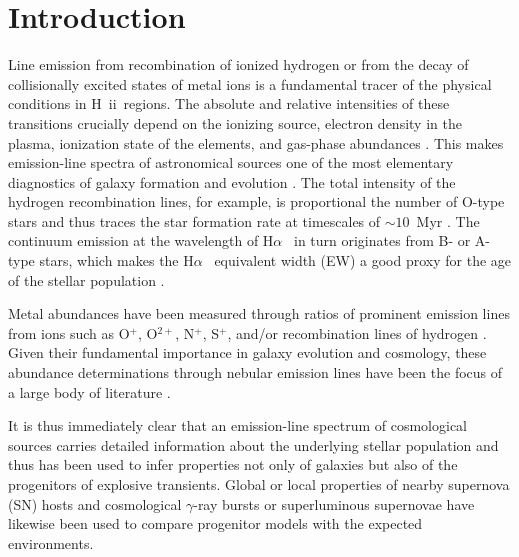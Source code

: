 \documentclass[traditabstract]{aa}
\newcommand{\ha}{H$\alpha$}
\newcommand{\hii}{\mbox{H~{\sc ii}}}
\begin{document}
\maketitle

\section{Introduction}
\label{sec:Intro}

Line emission from recombination of ionized hydrogen or from the decay of collisionally excited states of metal ions {is a fundamental tracer of the physical conditions in \hii\ regions}. The absolute and relative intensities of these transitions crucially depend on the ionizing source, electron density in the plasma, ionization state of the elements, and gas-phase abundances \citep{1989agna.book.....O}. This makes emission-line spectra of astronomical sources one of the most elementary diagnostics of galaxy formation and evolution \citep[e.g.,][]{2004ApJ...613..898T, 2006ApJ...644..813E, 2009ApJ...706.1364F}. The total intensity of the hydrogen recombination lines, for example, is proportional the number of O-type stars and thus traces the star formation rate at timescales of $\sim10$~Myr \citep[e.g.,][]{1998ARA&A..36..189K}. The continuum emission at the wavelength of \ha~ in turn originates from B- or A-type stars, which makes the \ha~ equivalent width (EW) a good proxy for the age of the stellar population \citep{1999ApJS..123....3L, 2013ApJ...779..170L}.

Metal abundances have been measured through ratios of prominent emission lines from ions such as O$^{+}$, O$^{2+}$, N$^{+}$, S$^{+}$, and/or recombination lines of hydrogen \citep{1979MNRAS.189...95P, 1979A&A....78..200A}. Given their fundamental importance in galaxy evolution and cosmology, these abundance determinations through nebular emission lines have been the focus of a large body of literature \citep[e.g.,][]{2004ApJ...617..240K, 2005ApJ...631..231P, 2006A&A...454L.127S, 2006A&A...448..955I, 2008ApJ...681.1183K}.

It is thus immediately clear that an emission-line spectrum of cosmological sources carries detailed information about the underlying stellar population and thus has been used to infer properties not only of galaxies but also of the progenitors of explosive transients. Global \citep[e.g.,][]{2008ApJ...673..999P, 2011MNRAS.412.1441L} or local \citep[e.g.,][]{2010MNRAS.407.2660A, 2011ApJ...731L...4M, 2011A&A...530A..95L} properties of nearby supernova (SN) hosts and cosmological $\gamma$-ray bursts \citep[GRBs; e.g.,][]{2007A&A...464..529W, 2012A&A...546A...8K, 2013ApJ...774..119G} or superluminous supernovae \citep[e.g.,][]{2013ApJ...763L..28C, 2014ApJ...787..138L, 2014arXiv1409.8331L, 2016arXiv160408207P} have likewise been used to compare progenitor models with the expected environments. 
\end{document}
